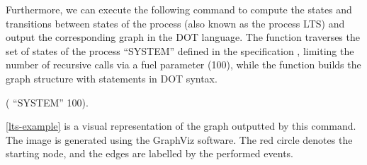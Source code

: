 Furthermore, we can execute the following command to compute the states and transitions between states of the process (also known as the process LTS) and output the corresponding graph in the DOT language. The function  traverses the set of states of the process ``SYSTEM'' defined in the specification , limiting the number of recursive calls via a fuel parameter (100), while the function  builds the graph structure with statements in DOT syntax.

\begin{coqdoccode}
	\coqdocnoindent
	  (  ``SYSTEM'' 100).\coqdoceol
\end{coqdoccode}

\autoref{lts-example} is a visual representation of the graph outputted by this command. The image is generated using the GraphViz software. The red circle denotes the starting node, and the edges are labelled by the performed events.

